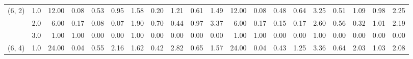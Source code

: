 \begin{tabular}{llrrrrrrrrrrrrrrrrrr}
(6, 2) & 1.0 &              12.00 &                     0.08 &                                 0.53 &                             0.95 &                           1.58 &                                               0.20 &                                            1.21 &                                            0.61 &                                        1.49 &              12.00 &                     0.08 &                                 0.48 &                             0.64 &                           3.25 &                                               0.51 &                                            1.09 &                                            0.98 &                                        2.25 \\
       & 2.0 &               6.00 &                     0.17 &                                 0.08 &                             0.07 &                           1.90 &                                               0.70 &                                            0.44 &                                            0.97 &                                        3.37 &               6.00 &                     0.17 &                                 0.15 &                             0.17 &                           2.60 &                                               0.56 &                                            0.32 &                                            1.01 &                                        2.19 \\
       & 3.0 &               1.00 &                     1.00 &                                 0.00 &                             0.00 &                           1.00 &                                               0.00 &                                            0.00 &                                            0.00 &                                        0.00 &               1.00 &                     1.00 &                                 0.00 &                             0.00 &                           1.00 &                                               0.00 &                                            0.00 &                                            0.00 &                                        0.00 \\
(6, 4) & 1.0 &              24.00 &                     0.04 &                                 0.55 &                             2.16 &                           1.62 &                                               0.42 &                                            2.82 &                                            0.65 &                                        1.57 &              24.00 &                     0.04 &                                 0.43 &                             1.25 &                           3.36 &                                               0.64 &                                            2.03 &                                            1.03 &                                        2.08 \\

\end{tabular}
